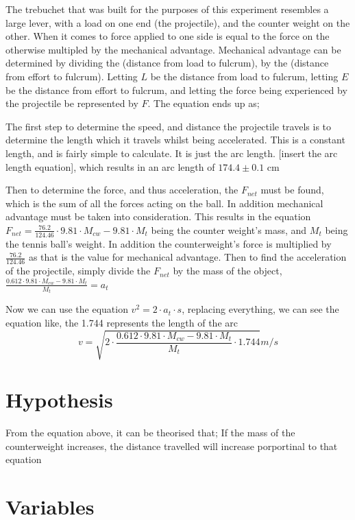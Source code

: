 \documentclass[12pt]{article}
\begin{document}

The trebuchet that was built for the purposes of this experiment resembles a large lever, with a load on one end (the projectile), and the counter weight on the other. When it comes to force applied to one side is equal to the force on the otherwise multipled by the mechanical advantage. Mechanical advantage can be determined by dividing the (distance from load to fulcrum), by the (distance from effort to fulcrum). Letting \(L\) be the distance from load to fulcrum, letting \(E\) be the distance from effort to fulcrum, and letting the force being experienced by the projectile be represented by \(F\). The equation ends up as;


The first step to determine the speed, and distance the projectile travels is to determine the length which it travels whilst being accelerated. This is a constant length, and is fairly simple to calculate. It is just the arc length. [insert the arc length equation], which results in an arc length of \(174.4 \pm 0.1 \) cm

Then to determine the force, and thus acceleration, the \(F_{net}\) must be found, which is the sum of all the forces acting on the ball. In addition mechanical advantage must be taken into consideration. This results in the equation \(F_{net} = \frac{76.2}{124.46} \cdot 9.81 \cdot M_{cw} - 9.81 \cdot M_{t}\) being the counter weight's mass, and \(M_{t}\) being the tennis ball's weight. In addition the counterweight's force is multiplied by \(\frac{76.2}{124.46}\) as that is the value for mechanical advantage. Then to find the acceleration of the projectile, simply divide the \(F_{net}\) by the mass of the object, \( \frac{0.612 \cdot 9.81 \cdot M_{cw} - 9.81 \cdot M_{t}}{M_{t}} = a_{t}\)

Now we can use the equation \(v^{2} = 2 \cdot a_{t} \cdot s\), replacing everything, we can see the equation like, the 1.744 represents the length of the arc
\[ v = \sqrt{2 \cdot  \frac{0.612 \cdot 9.81 \cdot M_{cw} - 9.81 \cdot M_{t}}{M_{t}} \cdot 1.744} m/s\]
\section{Hypothesis}
From the equation above, it can be theorised that; If the mass of the counterweight increases, the distance travelled will increase porportinal to that equation

\section{Variables}
\end{document}
